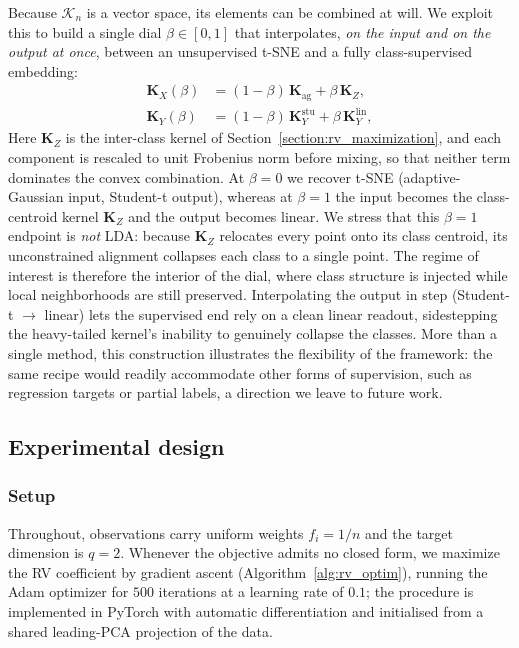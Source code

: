 \documentclass[11pt]{article}
\begin{document}
	Because $\mathcal{K}_n$ is a vector space, its elements can be combined at will. We
	exploit this to build a single dial $\beta\in[0,1]$ that interpolates, \emph{on the
		input and on the output at once}, between an unsupervised t-SNE and a fully
	class-supervised embedding:
	\begin{align}
		\mathbf{K}_X(\beta) &= (1-\beta)\,\mathbf{K}_{\mathrm{ag}} + \beta\,\mathbf{K}_Z, \\
		\mathbf{K}_Y(\beta) &= (1-\beta)\,\mathbf{K}^{\mathrm{stu}}_Y + \beta\,\mathbf{K}^{\mathrm{lin}}_Y,
	\end{align}
	Here $\mathbf{K}_Z$ is the inter-class kernel of
	Section~\ref{section:rv_maximization}, and each component is rescaled to unit
	Frobenius norm before mixing, so that neither term dominates the convex
	combination. At $\beta=0$ we recover t-SNE (adaptive-Gaussian input, Student-t
	output), whereas at $\beta=1$ the input becomes the class-centroid kernel
	$\mathbf{K}_Z$ and the output becomes linear. We stress that this $\beta=1$
	endpoint is \emph{not} LDA: because $\mathbf{K}_Z$ relocates every point onto its
	class centroid, its unconstrained alignment collapses each class to a single point.
	The regime of interest is therefore the interior of the dial, where class structure
	is injected while local neighborhoods are still preserved. Interpolating the output
	in step (Student-t $\to$ linear) lets the supervised end rely on a clean linear
	readout, sidestepping the heavy-tailed kernel's inability to genuinely collapse the
	classes. More than a single method, this construction illustrates the flexibility of
	the framework: the same recipe would readily accommodate other forms of supervision,
	such as regression targets or partial labels, a direction we leave to future work.
	
	\subsection{Experimental design}
	\label{subsec:experimental_design}
	
	\subsubsection{Setup}
	\label{subsec:common}
	
	Throughout, observations carry uniform weights $f_i = 1/n$ and the target dimension is $q=2$. Whenever the objective admits no closed form, we maximize the RV coefficient by gradient ascent (Algorithm~\ref{alg:rv_optim}), running the Adam optimizer for $500$ iterations at a learning rate of $0.1$; the procedure is implemented in PyTorch with automatic differentiation and initialised from a shared leading-PCA projection of the data.
	
\end{document}
